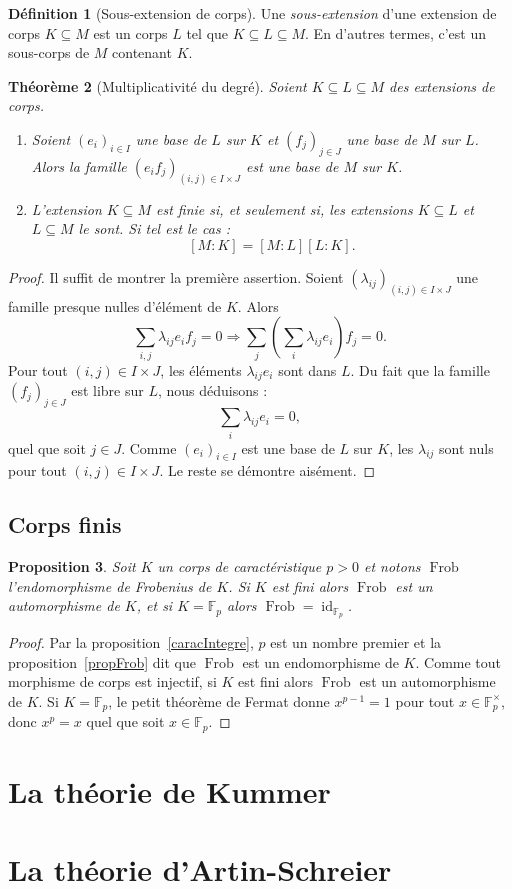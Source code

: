 \documentclass[a4paper, titlepage]{article}
\newtheorem{theo}{Théorème}[section]
\newtheorem{prop}[theo]{Proposition}
\theoremstyle{definition}
\newtheorem{defi}[theo]{Définition}
\theoremstyle{remark}
\def\F{\mathbb F}
\def\frob{\operatorname{Frob}}
\def\id{\operatorname{id}}
\begin{document}
\begin{defi}[Sous-extension de corps]
Une \textit{sous-extension} d'une extension de corps $K\subseteq M$ est un corps $L$ tel que $K\subseteq L \subseteq M$. En d'autres termes, c'est un sous-corps de $M$ contenant $K$.
\end{defi}

\begin{theo}[Multiplicativité du degré]
Soient $K\subseteq L \subseteq M$ des extensions de corps. \begin{enumerate}
\item Soient ${(e_i)}_{i\in I}$ une base de $L$ sur $K$ et ${(f_j)}_{j\in J}$ une base de $M$ sur $L$. Alors la famille ${(e_if_j)}_{(i,j)\in I\times J}$ est une base de $M$ sur $K$.
\item L'extension $K \subseteq M$ est finie si, et seulement si, les extensions $K\subseteq L$ et $L \subseteq M$ le sont. Si tel est le cas :
$$[M:K] = [M:L][L:K].$$
\end{enumerate}
\end{theo}

\begin{proof}
Il suffit de montrer la première assertion. Soient ${(\lambda_{ij})}_{(i,j)\in I\times J}$ une famille presque nulles d'élément de $K$. Alors 
$$\sum_{i,j} \lambda_{ij} e_i f_j = 0 \Rightarrow \sum_j \left( \sum_i\lambda_{ij}e_i\right) f_j = 0.$$
Pour tout $(i,j) \in I\times J$, les éléments $\lambda_{ij}e_i$ sont dans $L$. Du fait que la famille ${(f_j)}_{j\in J}$ est libre sur $L$, nous déduisons :
$$\sum_i\lambda_{ij}e_i = 0,$$
quel que soit $j \in J$. Comme ${(e_i)}_{i\in I}$ est une base de $L$ sur $K$, les $\lambda_{ij}$ sont nuls pour tout $(i,j) \in I\times J$. Le reste se démontre aisément.
\end{proof}

\subsection{Corps finis}

\begin{prop}
Soit $K$ un corps de caractéristique $p > 0$ et notons $\frob$ l'endomorphisme de Frobenius de $K$. Si $K$ est fini alors $\frob$ est un automorphisme de $K$, et si $K = \F_p$ alors $\frob = \id_{\F_p}$.
\end{prop}

\begin{proof}
Par la proposition~\ref{caracIntegre}, $p$ est un nombre premier et la proposition~\ref{propFrob} dit que $\frob$ est un endomorphisme de $K$. Comme tout morphisme de corps est injectif, si $K$ est fini alors $\frob$ est un automorphisme de $K$. Si $K = \F_p$, le petit théorème de Fermat donne $x^{p-1} = 1$ pour tout $x \in \F_p^\times$, donc $x^p =x$ quel que soit $x \in\F_p$.
\end{proof}

\section{La théorie de Kummer}

\section{La théorie d'Artin-Schreier}

\newpage


\end{document}
